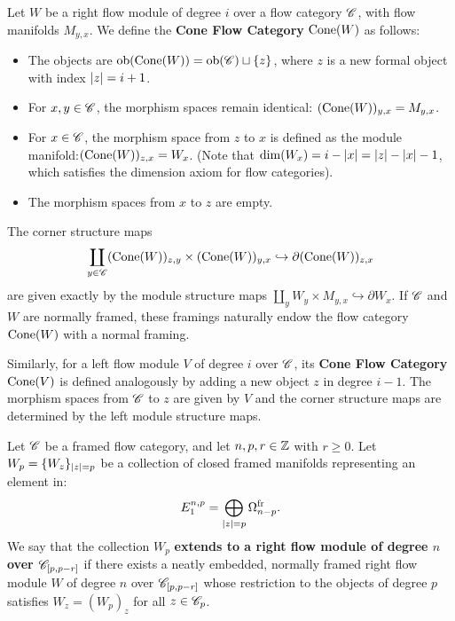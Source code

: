 \begin{defn}\label{def:ConeFlowCategory}
    Let $W$ be a right flow module of degree $i$ over a flow category $\mathscr{C}$, with flow manifolds $M_{y,x}$. We define the \textbf{Cone Flow Category} $\operatorname{Cone}(W)$ as follows:
    \begin{itemize}
        \item The objects are $\mathrm{ob}(\operatorname{Cone}(W)) = \mathrm{ob}(\mathscr{C}) \sqcup \{z\}$, where $z$ is a new formal object with index $\left\lvert z\right\rvert = i+1$.
        \item For $x, y \in \mathscr{C}$, the morphism spaces remain identical: $(\operatorname{Cone}(W))_{y,x} = M_{y,x}$.
        \item For $x \in \mathscr{C}$, the morphism space from $z$ to $x$ is defined as the module manifold:\newline $(\operatorname{Cone}(W))_{z,x} = W_x$. (Note that $\dim(W_x) = i - \left\lvert x\right\rvert = \left\lvert z\right\rvert - \left\lvert x\right\rvert - 1$, which satisfies the dimension axiom for flow categories).
        \item The morphism spaces from $x$ to $z$ are empty.
    \end{itemize}

    The corner structure maps
    \begin{equation*}
        \coprod_{y \in \mathscr{C}} (\operatorname{Cone}(W))_{z,y} \times (\operatorname{Cone}(W))_{y,x} \hookrightarrow \partial (\operatorname{Cone}(W))_{z,x}
    \end{equation*}
    are given exactly by the module structure maps $\coprod_y W_y \times M_{y,x} \hookrightarrow \partial W_x$. If $\mathscr{C}$ and $W$ are normally framed, these framings naturally endow the flow category $\operatorname{Cone}(W)$ with a normal framing.

    Similarly, for a left flow module $V$ of degree $i$ over $\mathscr{C}$, its \textbf{Cone Flow Category} $\operatorname{Cone}(V)$ is defined analogously by adding a new object $z$ in degree $i-1$. The morphism spaces from $\mathscr{C}$ to $z$ are given by $V$ and the corner structure maps are determined by the left module structure maps.
\end{defn}


\begin{defn}\label{def:ModuleSurvives}
    Let $\mathscr{C}$ be a framed flow category, and let $n, p, r \in \mathbb{Z}$ with $r \geq 0$. Let $W_p = \{W_z\}_{\left\lvert z\right\rvert=p}$ be a collection of closed framed manifolds representing an element in:
    \begin{equation*}
        E_{1}^{n,p} = \bigoplus_{\left\lvert z\right\rvert=p} \Omega^{\operatorname{fr}}_{n-p}.
    \end{equation*}
    We say that the collection $W_p$ \textbf{extends to a right flow module of degree $n$ over $\mathscr{C}_{[p,p-r]}$} if there exists a neatly embedded, normally framed right flow module $W$ of degree $n$ over $\mathscr{C}_{[p,p-r]}$ whose restriction to the objects of degree $p$ satisfies $W_z = (W_p)_z$ for all $z \in \mathscr{C}_p$.
\end{defn}

